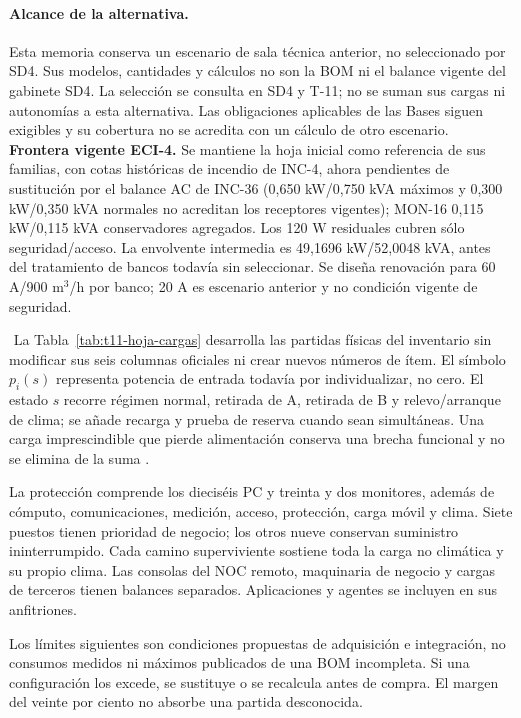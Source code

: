 \paragraph{Alcance de la alternativa.} Esta memoria conserva un escenario de sala técnica anterior, no seleccionado por SD4. Sus modelos, cantidades y cálculos no son la BOM ni el balance vigente del gabinete SD4. La selección se consulta en SD4 y T-11; no se suman sus cargas ni autonomías a esta alternativa. Las obligaciones aplicables de las Bases siguen exigibles y su cobertura no se acredita con un cálculo de otro escenario.
\textbf{Frontera vigente ECI-4.} Se mantiene la hoja inicial como referencia de sus familias, con cotas históricas de incendio de INC-4, ahora pendientes de sustitución por el balance AC de INC-36 (0,650 kW/0,750 kVA máximos y 0,300 kW/0,350 kVA normales no acreditan los receptores vigentes); MON-16 0,115 kW/0,115 kVA conservadores agregados. Los 120 W residuales cubren sólo seguridad/acceso. La envolvente intermedia es 49,1696 kW/52,0048 kVA, antes del tratamiento de bancos todavía sin seleccionar. Se diseña renovación para 60 A/900 m$^3$/h por banco; 20 A es escenario anterior y no condición vigente de seguridad.

﻿
La Tabla~\ref{tab:t11-hoja-cargas} desarrolla las partidas físicas del inventario sin modificar sus seis columnas oficiales ni crear nuevos números de ítem. El símbolo $p_i(s)$ representa potencia de entrada todavía por individualizar, no cero. El estado $s$ recorre régimen normal, retirada de A, retirada de B y relevo/arranque de clima; se añade recarga y prueba de reserva cuando sean simultáneas. Una carga imprescindible que pierde alimentación conserva una brecha funcional y no se elimina de la suma \parencites[RT-06.07--11/13, p.~15; RT-08.01/04, p.~18]{pucv-transversal}[cap.~15, RT-03.10 y RT-06.01]{caso07}.

La protección comprende los dieciséis PC y treinta y dos monitores, además de cómputo, comunicaciones, medición, acceso, protección, carga móvil y clima. Siete puestos tienen prioridad de negocio; los otros nueve conservan suministro ininterrumpido. Cada camino superviviente sostiene toda la carga no climática y su propio clima. Las consolas del NOC remoto, maquinaria de negocio y cargas de terceros tienen balances separados. Aplicaciones y agentes se incluyen en sus anfitriones.

Los límites siguientes son condiciones propuestas de adquisición e integración, no consumos medidos ni máximos publicados de una BOM incompleta. Si una configuración los excede, se sustituye o se recalcula antes de compra. El margen del veinte por ciento no absorbe una partida desconocida.

